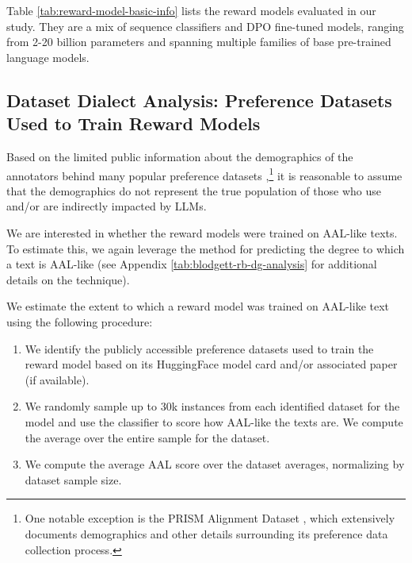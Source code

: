 Table \ref{tab:reward-model-basic-info} lists the reward models evaluated in our study. They are a mix of sequence classifiers and DPO fine-tuned models, ranging from 2-20 billion parameters and spanning multiple families of base pre-trained language models.

\subsection{Dataset Dialect Analysis: Preference Datasets Used to Train Reward Models}
\label{app:reward-models-training-data-analysis}
Based on the limited public information about the demographics of the annotators behind many popular preference datasets \cite{kirk_past_2023, casper2023open},\footnote{One notable exception is the PRISM Alignment Dataset \cite{kirk_prism_2024}, which extensively documents demographics and other details surrounding its preference data collection process.} it is reasonable to assume that the demographics do not represent the true population of those who use and/or are indirectly impacted by LLMs.

We are interested in whether the reward models were trained on AAL-like texts. To estimate this, we again leverage the \citet{blodgett_demographic_2016} method for predicting the degree to which a text is AAL-like (see Appendix \ref{tab:blodgett-rb-dg-analysis} for additional details on the technique). 

We estimate the extent to which a reward model was trained on AAL-like text using the following procedure:
\begin{enumerate}
    \item We identify the publicly accessible preference datasets used to train the reward model based on its HuggingFace model card and/or associated paper (if available).
    \item We randomly sample up to 30k instances from each identified dataset for the model and use the \citet{blodgett_demographic_2016} classifier to score how AAL-like the texts are. We compute the average over the entire sample for the dataset. 
    \item We compute the average AAL score over the dataset averages, normalizing by dataset sample size.
\end{enumerate}

